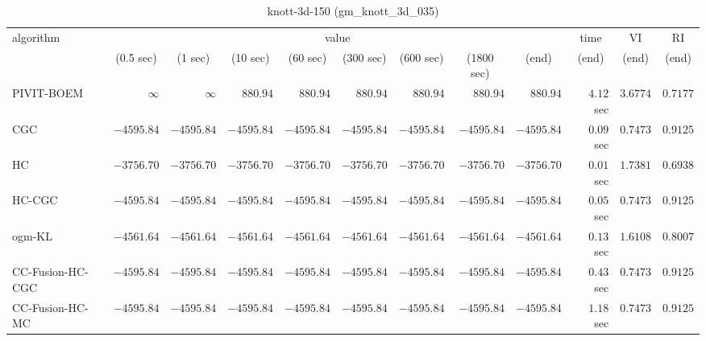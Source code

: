 \begin{table}[H]
\scriptsize
\centering
\caption{knott-3d-150 (gm\_knott\_3d\_035)}
\label{tab:anytimetable-knott-3d-150-gm-knott-3d-035}
\begin{tabular}{lrrrrrrrrrrr}
\toprule
           algorithm &                                   \multicolumn{8}{c}{value} & \multicolumn{1}{c}{time}    & \multicolumn{1}{c}{VI}  & \multicolumn{1}{c}{RI} \\  
\cmidrule(lr){2-9}\cmidrule(lr){10-10} \cmidrule(lr){11-11} \cmidrule(lr){12-12}   
                     & \multicolumn{1}{c}{(0.5 sec)} & \multicolumn{1}{c}{(1 sec)} & \multicolumn{1}{c}{(10 sec)} & \multicolumn{1}{c}{(60 sec)} & \multicolumn{1}{c}{(300 sec)} & \multicolumn{1}{c}{(600 sec)} & \multicolumn{1}{c}{(1800 sec)} & \multicolumn{1}{c}{(end)} & \multicolumn{1}{c}{(end)}    & \multicolumn{1}{c}{(end)}   & \multicolumn{1}{c}{(end)}  \\ \midrule 
          PIVIT-BOEM & $\infty$ & $\infty$ & $       880.94$ & $       880.94$ & $       880.94$ & $       880.94$ & $       880.94$ & $       880.94$ & $         4.12$ sec    & $       3.6774$  & $       0.7177$ \\ 
                 CGC & $     -4595.84$ & $     -4595.84$ & $     -4595.84$ & $     -4595.84$ & $     -4595.84$ & $     -4595.84$ & $     -4595.84$ & $     -4595.84$ & $         0.09$ sec    & $       0.7473$  & $       0.9125$ \\ 
                  HC & $     -3756.70$ & $     -3756.70$ & $     -3756.70$ & $     -3756.70$ & $     -3756.70$ & $     -3756.70$ & $     -3756.70$ & $     -3756.70$ & $         0.01$ sec    & $       1.7381$  & $       0.6938$ \\ 
              HC-CGC & $     -4595.84$ & $     -4595.84$ & $     -4595.84$ & $     -4595.84$ & $     -4595.84$ & $     -4595.84$ & $     -4595.84$ & $     -4595.84$ & $         0.05$ sec    & $       0.7473$  & $       0.9125$ \\ 
              ogm-KL & $     -4561.64$ & $     -4561.64$ & $     -4561.64$ & $     -4561.64$ & $     -4561.64$ & $     -4561.64$ & $     -4561.64$ & $     -4561.64$ & $         0.13$ sec    & $       1.6108$  & $       0.8007$ \\ 
    CC-Fusion-HC-CGC & $     -4595.84$ & $     -4595.84$ & $     -4595.84$ & $     -4595.84$ & $     -4595.84$ & $     -4595.84$ & $     -4595.84$ & $     -4595.84$ & $         0.43$ sec    & $       0.7473$  & $       0.9125$ \\ 
     CC-Fusion-HC-MC & $     -4595.84$ & $     -4595.84$ & $     -4595.84$ & $     -4595.84$ & $     -4595.84$ & $     -4595.84$ & $     -4595.84$ & $     -4595.84$ & $         1.18$ sec    & $       0.7473$  & $       0.9125$ \\ 

\end{tabular}
\end{table}
